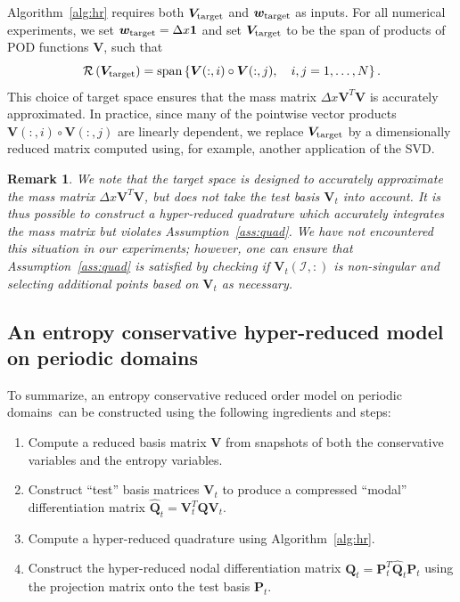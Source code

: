 \documentclass[review]{siamart171218}
\newtheorem*{remark}{Remark}
\theoremstyle{assumption}
\renewcommand{\hat}{\widehat}
\newcommand{\LRp}[1]{\left( #1 \right)}
\newcommand{\LRc}[1]{\left\{ #1 \right\}}
\begin{document}
Algorithm~\ref{alg:hr} requires both $\bm{V}_{\rm target}$ and $\bm{w}_{\rm target}$ as inputs. For all numerical experiments, we set $\bm{w}_{\rm target} = \Delta x \bm{1}$ and set $\bm{V}_{\rm target}$ to be the span of products of POD functions $\bm{V}$, such that
\[
\mathcal{R}\LRp{\bm{V}_{\rm target}} = {\rm span}\LRc{\bm{V}(:,i) \circ \bm{V}(:,j), \quad i,j = 1,\ldots, N}.
\]
This choice of target space ensures that the mass matrix $\Delta x \bm{V}^T\bm{V}$ is accurately approximated.  In practice, since many of the pointwise vector products $\bm{V}(:,i) \circ \bm{V}(:,j)$ are linearly dependent, we replace $\bm{V}_{\rm target}$ by a dimensionally reduced matrix computed using, for example, another application of the SVD.  %

\begin{remark}
We note that the target space is designed to accurately approximate the mass matrix $\Delta x \bm{V}^T\bm{V}$, but does not take the test basis $\bm{V}_{t}$ into account.  It is thus possible to construct a hyper-reduced quadrature which accurately integrates the mass matrix but violates Assumption~\ref{ass:quad}.  We have not encountered this situation in our experiments; however, one can ensure that Assumption~\ref{ass:quad} is satisfied by checking if $\bm{V}_t\LRp{\mathcal{I},:}$ is non-singular and selecting additional points based on $\bm{V}_t$ as necessary.  
\end{remark}

 
\subsection{An entropy conservative hyper-reduced model on periodic domains}

To summarize, an entropy conservative reduced order model on periodic domains can be constructed using the following ingredients and steps:
\begin{enumerate}
\item Compute a reduced basis matrix $\bm{V}$ from snapshots of both the conservative variables and the entropy variables.  
\item Construct ``test'' basis matrices $\bm{V}_t$ to produce a compressed ``modal'' differentiation matrix $\hat{\bm{Q}}_t = \bm{V}_t^T\bm{Q}\bm{V}_t$.
\item Compute a hyper-reduced quadrature using Algorithm~\ref{alg:hr}.  
\item Construct the hyper-reduced nodal differentiation matrix $\bm{Q}_t = \bm{P}_t^T\hat{\bm{Q}}_t\bm{P}_t$ using the projection matrix onto the test basis $\bm{P}_t$.
\end{enumerate}
\end{document}
